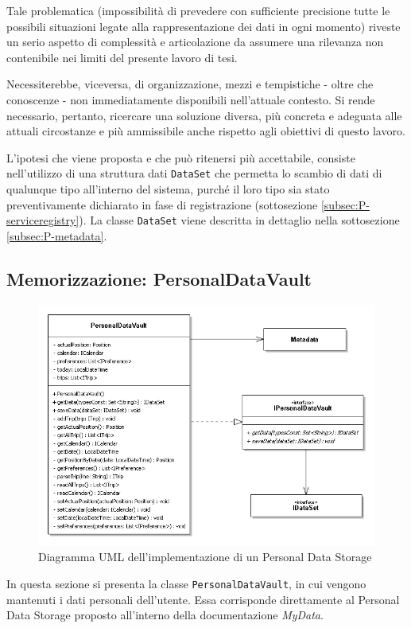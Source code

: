Tale problematica (impossibilit\`a di prevedere con sufficiente precisione tutte le possibili situazioni legate alla rappresentazione dei dati in ogni momento) riveste un serio aspetto di complessit\`a e articolazione da assumere una rilevanza non contenibile nei limiti del presente lavoro di tesi.

Necessiterebbe, viceversa, di organizzazione, mezzi e tempistiche - oltre che conoscenze - non immediatamente disponibili nell'attuale contesto. Si rende necessario, pertanto, ricercare una soluzione diversa, pi\`u concreta e adeguata alle attuali circostanze e pi\`u ammissibile anche rispetto agli obiettivi di questo lavoro.

L'ipotesi che viene proposta e che pu\`o ritenersi pi\`u accettabile, consiste nell’utilizzo di una struttura dati \texttt{DataSet} che permetta lo scambio di dati di qualunque tipo all’interno del sistema, purch\'e il loro tipo sia stato preventivamente dichiarato in fase di registrazione (sottosezione \ref{subsec:P-serviceregistry}). La classe \texttt{DataSet} viene descritta in dettaglio nella sottosezione \ref{subsec:P-metadata}.

\subsection{Memorizzazione: PersonalDataVault}
\label{subsec:P-PDV}
\begin{figure} [h]
	\centering
	\includegraphics[width=0.8\linewidth]{pictures/PersonalDataVault.png}
	\caption{Diagramma UML dell'implementazione di un Personal Data Storage}
	\label{fig:PersonalDataVault}
\end{figure}
In questa sezione si presenta la classe \texttt{PersonalDataVault}, in cui vengono mantenuti i dati personali dell’utente. Essa corrisponde direttamente al Personal Data Storage proposto all’interno della documentazione \textit{MyData}.

